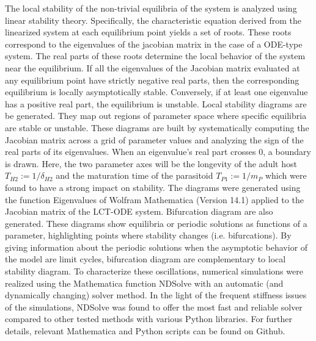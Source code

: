 \documentclass[12pt,a4paper,onecolumn]{article}
\begin{document}
\tabto{1 cm} The local stability of the non-trivial equilibria of the system is  analyzed using linear stability theory. Specifically, the characteristic equation derived from the linearized system at each equilibrium point yields a set of roots. These roots correspond to the eigenvalues of the jacobian matrix in the case of a ODE-type system. The real parts of these roots determine the local behavior of the system near the equilibrium. If all the eigenvalues of the Jacobian matrix evaluated at any equilibrium point have strictly negative real parts, then the corresponding equilibrium is locally asymptotically stable. Conversely, if at least one eigenvalue has a positive real part, the equilibrium is unstable. 
\tabto{1 cm} Local stability diagrams are be generated. They map out regions of parameter space where specific equilibria are stable or unstable. These diagrams are built by systematically computing the Jacobian matrix across a grid of parameter values and analyzing the sign of the real parts of its eigenvalues. When an eigenvalue's real part crosses 0, a boundary is drawn. Here, the two parameter axes will be the longevity of the adult host $T_{H2} := 1/\delta_{H2}$ and the maturation time of the parasitoid $T_{P1} := 1/m_P$ which were found to have a strong impact on stability. The diagrams were generated using the function Eigenvalues of Wolfram Mathematica (Version 14.1) applied to the Jacobian matrix of the LCT-ODE system. 
\tabto{1 cm} Bifurcation diagram are also generated. These diagrams show equilibria or periodic solutions as functions of a  parameter, highlighting points where stability changes (i.e. bifurcations). By giving information about the periodic solutions when the asymptotic behavior of the model are limit cycles, bifurcation diagram are complementary to local stability diagram. To characterize these oscillations, numerical simulations were realized using the Mathematica function NDSolve with an automatic (and dynamically changing) solver method. In the light of the frequent stiffness issues of the simulations, NDSolve was found to offer the most fast and reliable solver compared to other tested methods with various Python libraries. For further details, relevant Mathematica and Python scripts can be found on Github.\\
\end{document}
